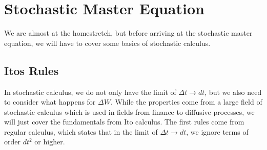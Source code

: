 
\section{Stochastic Master Equation}
We are almost at the homestretch, but before arriving at the stochastic master equation, we will have to cover some basics of stochastic calculus.

\subsection{Itos Rules}
In stochastic calculus, we do not only have the limit of $\Delta t \to dt$, but we also need to consider what happens for $\Delta W$. While the properties come from a large field of stochastic calculus which is used in fields from finance to diffusive processes, we will just cover the fundamentals from Ito calculus. The first rules come from regular calculus, which states that in the limit of $\Delta t \to dt$, we ignore terms of order $dt^2$ or higher. 

